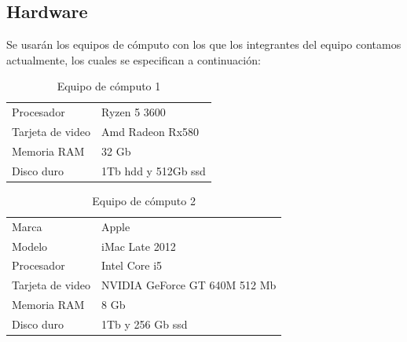 \documentclass[12pt, a4paper, titlepage]{report}
\begin{document}
		\subsection{Hardware}
			Se usarán los equipos de cómputo con los que los integrantes del equipo contamos actualmente, los cuales se especifican a continuación: 
            \begin{table}[H]
            	\begin{tabular}{|p{3.5cm}||p{10cm}|}
            		\rowcolor{guindapoli}
            		\multicolumn{2}{|c|}{\textbf{\textcolor{white}{Equipo de cómputo utilizado. [1]}}}\\
            		\hline
            		\rowcolor{azulclaro}Procesador & Ryzen 5 3600\\
            		\hline
            		\rowcolor{white}Tarjeta de video & Amd Radeon Rx580\\
            		\hline
            		\rowcolor{azulclaro}Memoria RAM & 32 Gb\\
            		\hline
            		\rowcolor{white}Disco duro & 1Tb \acrshort{hdd} y 512Gb \acrshort{ssd}\\
            		\hline
            	\end{tabular}
            	\caption[Equipo de cómputo 1]{Equipo de cómputo 1}
            \end{table}
            \begin{table}[H]
            	\begin{tabular}{|p{3.5cm}||p{10cm}|}
            		\rowcolor{guindapoli}
            		\multicolumn{2}{|c|}{\textbf{\textcolor{white}{Equipo de cómputo utilizado. [2]}}}\\
            		\hline
            		\rowcolor{azulclaro}Marca & Apple\\
            		\hline
            		\rowcolor{white}Modelo & iMac Late 2012\\
            		\hline
            		\rowcolor{azulclaro}Procesador & Intel Core i5\\
            		\hline
            		\rowcolor{white}Tarjeta de video & NVIDIA GeForce GT 640M 512 Mb\\
            		\hline
            		\rowcolor{azulclaro}Memoria RAM & 8 Gb\\
            		\hline
            		\rowcolor{white}Disco duro & 1Tb y 256 Gb \acrshort{ssd}\\
            		\hline
            	\end{tabular}
            	\caption[Equipo de cómputo 2]{Equipo de cómputo 2}
            \end{table}
\end{document}
